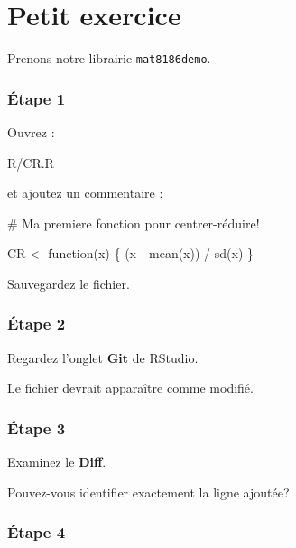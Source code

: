 \documentclass[
  letterpaper,
  DIV=11,
  numbers=noendperiod]{scrreprt}
\newenvironment{Shaded}{\begin{snugshade}}{\end{snugshade}}
\newcommand{\CommentTok}[1]{\textcolor[rgb]{0.37,0.37,0.37}{#1}}
\newcommand{\ControlFlowTok}[1]{\textcolor[rgb]{0.00,0.23,0.31}{#1}}
\newcommand{\FunctionTok}[1]{\textcolor[rgb]{0.28,0.35,0.67}{#1}}
\newcommand{\NormalTok}[1]{\textcolor[rgb]{0.00,0.23,0.31}{#1}}
\newcommand{\OtherTok}[1]{\textcolor[rgb]{0.00,0.23,0.31}{#1}}
\newcommand{\SpecialCharTok}[1]{\textcolor[rgb]{0.37,0.37,0.37}{#1}}
\begin{document}

\chapter{Petit exercice}\label{petit-exercice}

Prenons notre librairie \texttt{mat8186demo}.

\subsection{Étape 1}\label{uxe9tape-1}

Ouvrez :

\begin{Shaded}
\begin{Highlighting}[]
\NormalTok{R/CR.R}
\end{Highlighting}
\end{Shaded}

et ajoutez un commentaire :

\begin{Shaded}
\begin{Highlighting}[]
\CommentTok{\# Ma premiere fonction pour centrer{-}réduire!}

\NormalTok{CR }\OtherTok{\textless{}{-}} \ControlFlowTok{function}\NormalTok{(x) \{}
\NormalTok{  (x }\SpecialCharTok{{-}} \FunctionTok{mean}\NormalTok{(x)) }\SpecialCharTok{/} \FunctionTok{sd}\NormalTok{(x)}
\NormalTok{\}}
\end{Highlighting}
\end{Shaded}

Sauvegardez le fichier.

\subsection{Étape 2}\label{uxe9tape-2}

Regardez l'onglet \textbf{Git} de RStudio.

Le fichier devrait apparaître comme modifié.

\subsection{Étape 3}\label{uxe9tape-3}

Examinez le \textbf{Diff}.

Pouvez-vous identifier exactement la ligne ajoutée?

\subsection{Étape 4}\label{uxe9tape-4}
\end{document}
